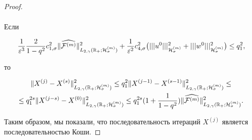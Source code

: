 \begin{proof}
\begin{multline*}
\end{multline*}

Если

$$

\frac{1}{\varepsilon^3}\frac{2}{1-q^2}c^2_{1,\sigma}

\|\widehat{{\cal F}^{(m)}} \|^2_{L_{2,\gamma}(\mathbb R_{+};{\cal H}^{(m)}_{\sigma})}+\frac{1}{\varepsilon^2}c^2_{4,\sigma} \bigl(|||u^0|||^2_{{\cal H}^{(m)}_\sigma}+|||w^0|||^2_{{\cal H}^{(m)}_\sigma}\bigr)\le q_1^2,

$$

то

\begin{multline}

\|X^{(j)}-X^{(s)}\|^2_{L_{2,\gamma}(\mathbb R_{+};{\cal H}^{(m)}_{\sigma})}\le 

q_1^2 

\|X^{(j-1)}-X^{(s-1)}\|^2_{L_{2,\gamma}(\mathbb R_{+};{\cal H}^{(m)}_{\sigma})}\le 

\\

\le q_1^{2s} 

\|X^{(j-s)}-X^{(0)}\|^2_{L_{2,\gamma}(\mathbb R_{+};{\cal H}^{(m)}_{\sigma})}\le q_1^{2s}(1+\frac{1}{1-q^2}) 

\|\widehat{{\cal F}^{(m)}}  \|^2_{L_{2,\gamma}(\mathbb R_{+};{\cal H}^{(m)}_{\sigma})}.

\end{multline}

Таким образом, мы показали, что последовательность итераций $X^{(j)}$ является последовательностью Коши.

\end{proof}



\smallskip



 \hypertarget{dukh:th:5}{}

